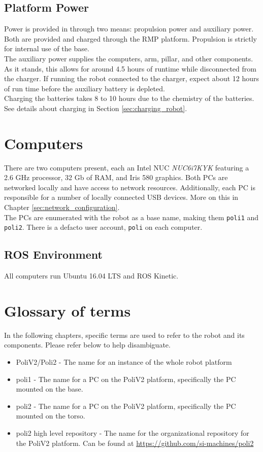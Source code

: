 \subsection{Platform Power}
Power is provided in through two means: propulsion power and auxiliary power. 
Both are provided and charged through the RMP platform. Propulsion is strictly for internal use of the base. \\

The auxiliary power supplies the computers, arm, pillar, and other components. 
As it stands, this allows for around 4.5 hours of runtime while disconnected from the charger. 
If running the robot connected to the charger, expect about 12 hours of run time before the auxiliary battery is depleted. \\

Charging the batteries takes 8 to 10 hours due to the chemistry of the batteries. 
See details about charging in Section \ref{sec:charging_robot}.


\section{Computers}
There are two computers present, each an Intel NUC \textit{NUC6i7KYK} featuring a 2.6 GHz processor, 32 Gb of RAM, and Iris 580 graphics. 
Both PCs are networked locally and have access to network resources. 
Additionally, each PC is responsible for a number of locally connected USB devices. 
More on this in Chapter \ref{sec:network_configuration}.\\

The PCs are enumerated with the robot as a base name, making them \texttt{poli1} and \texttt{poli2}. 
There is a defacto user account, \texttt{poli} on each computer.

\subsection{ROS Environment}
All computers run Ubuntu 16.04 LTS and ROS Kinetic.

\section{Glossary of terms}
In the following chapters, specific terms are used to refer to the robot and its components. 
Please refer below to help disambiguate.

\begin{itemize}
\item PoliV2/Poli2 - The name for an instance of the whole robot platform
\item poli1 - The name for a PC on the PoliV2 platform, specifically the PC mounted on the base.
\item poli2 - The name for a PC on the PoliV2 platform, specifically the PC mounted on the torso.
\item poli2 high level repository - The name for the organizational repository for the PoliV2 platform. Can be found at \href{https://github.com/si-machines/poli2}{https://github.com/si-machines/poli2}
\end{itemize}

